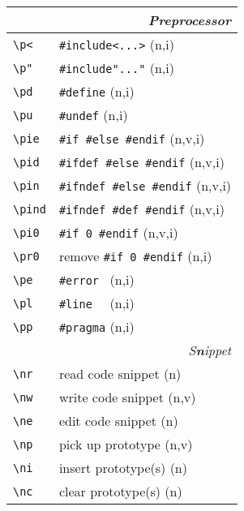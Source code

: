 \documentclass[oneside,10pt,landscape,DIV16]{scrartcl}
\begin{document}
\begin{multicols}{3}
\begin{center}
%
\begin{tabular}[]{|p{11mm}|p{58mm}|}
\hline
\multicolumn{2}{|r|}{\textsl{\textbf{P}reprocessor}}   \\
\hline \verb'\p<'   & \verb$#include<...>$         \hfill (n,i)\\
\hline \verb'\p"'   & \verb$#include"..."$         \hfill (n,i)\\
\hline \verb'\pd'   & \verb'#define'               \hfill (n,i)\\
\hline \verb'\pu'   & \verb'#undef'                \hfill (n,i)\\
\hline \verb'\pie'  & \verb'#if #else #endif'      \hfill (n,v,i)\\
\hline \verb'\pid'  & \verb'#ifdef #else #endif'   \hfill (n,v,i)\\
\hline \verb'\pin'  & \verb'#ifndef #else #endif'  \hfill (n,v,i)\\
\hline \verb'\pind' & \verb'#ifndef #def #endif'   \hfill (n,v,i)\\
\hline \verb'\pi0'  & \verb'#if 0 #endif'          \hfill (n,v,i)\\
\hline \verb'\pr0'  & remove \verb'#if 0 #endif'   \hfill (n,i)\\
\hline \verb'\pe'   & \verb'#error '               \hfill (n,i)\\
\hline \verb'\pl'   & \verb'#line  '               \hfill (n,i)\\
\hline \verb'\pp'   & \verb'#pragma'               \hfill (n,i)\\
\hline
\hline 
\multicolumn{2}{|r|}{\textsl{S\textbf{n}ippet}} \\
\hline \verb'\nr'  & read code snippet         \hfill (n)\\
\hline \verb'\nw'  & write code snippet        \hfill (n,v)\\
\hline \verb'\ne'  & edit code snippet         \hfill (n)\\
\hline \verb'\np'  & pick up prototype         \hfill (n,v)\\
\hline \verb'\ni'  & insert prototype(s)       \hfill (n)\\
\hline \verb'\nc'  & clear  prototype(s)       \hfill (n)\\

\end{tabular}
\end{center}
\end{multicols}
\end{document}
